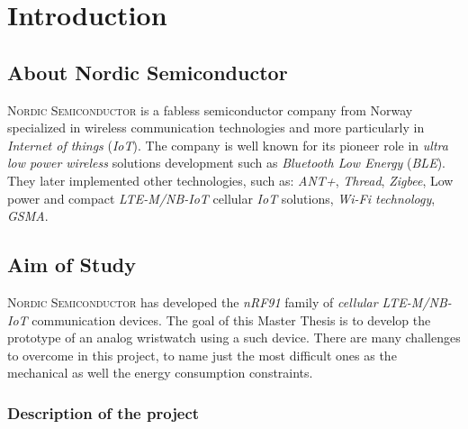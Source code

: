 \documentclass[Report.tex]{subfiles}
\begin{document}
\chapter{Introduction}

\section{About Nordic Semiconductor\cite{aboutNordicSemi}}

\textsc{Nordic Semiconductor} is a fabless semiconductor company from Norway specialized in wireless communication technologies and more particularly in \textit{Internet of things} (\textit{IoT}). The company is well known for its pioneer role in \textit{ultra low power wireless} solutions development such as \textit{Bluetooth Low Energy} (\textit{BLE}). They later implemented other technologies, such as: \textit{ANT+}, \textit{Thread}, \textit{Zigbee}, Low power and compact \textit{LTE-M/NB-IoT} cellular \textit{IoT} solutions, \textit{Wi-Fi technology}, \textit{GSMA}.

\section{Aim of Study}

\textsc{Nordic Semiconductor} has developed the \textit{nRF91} family of \textit{cellular LTE-M/NB-IoT} communication devices. The goal of this Master Thesis is to develop the prototype of an analog wristwatch using a such device. There are many challenges to overcome in this project, to name just the most difficult ones as the mechanical as well the energy consumption constraints.

\subsection{Description of the project}
\end{document}
